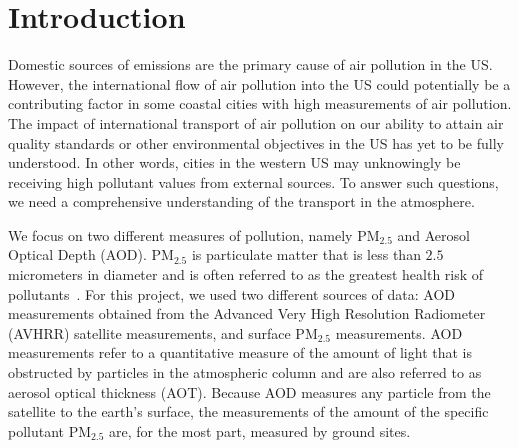 \documentclass[10pt]{article}
\begin{document}
\section{Introduction}

Domestic sources of emissions are the primary cause of air pollution in the
US. However, the international flow of air pollution into
the US could potentially be a contributing factor in some coastal cities with 
high measurements of air pollution. The impact of international transport of
air pollution on our ability to attain air quality standards or other
environmental objectives in the US has yet to be fully understood. In
other words, cities in the western US may unknowingly be receiving high
pollutant values from external sources. {To answer such questions, 
we need a comprehensive understanding of the transport in the
atmosphere.  }



{We focus on two different measures of pollution, namely PM$_{2.5}$ and Aerosol
Optical Depth (AOD).} PM$_{2.5}$ is particulate matter that is less than $2.5$
micrometers in diameter and is often referred to as the greatest health risk of
pollutants~\cite{epa}. For this project, we used two different sources of data: 
{AOD} measurements obtained from the Advanced Very High Resolution
Radiometer (AVHRR) satellite measurements, and surface PM$_{2.5}$ measurements.
AOD measurements refer to a quantitative measure of the amount of light that is
obstructed by particles in the atmospheric column and are also referred to as
aerosol optical thickness (AOT). Because AOD measures any particle from the
satellite to the earth's surface, the measurements of the amount of the
specific pollutant PM$_{2.5}$ are, for the most part, measured by ground sites.
\end{document}
